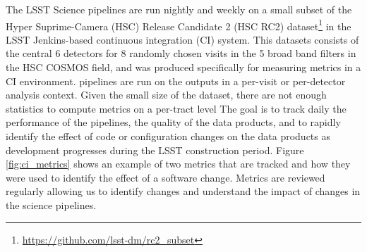 The LSST Science pipelines are run nightly and weekly on a small subset of the Hyper Suprime-Camera (HSC) Release Candidate 2 (HSC RC2) dataset\footnote{\url{https://github.com/lsst-dm/rc2_subset}} in the LSST Jenkins-based continuous integration (CI) system. 
This datasets consists of the central 6 detectors for 8 randomly chosen visits in the 5 broad band filters in the HSC COSMOS field, and was produced specifically for measuring metrics in a CI environment.
\faro pipelines are run on the outputs in a per-visit or per-detector analysis context.
Given the small size of the dataset, there are not enough statistics to compute metrics on a per-tract level 
The goal is to track daily the performance of the pipelines, the quality of the data products, and to rapidly identify the effect of code or configuration changes on the data products as development progresses during the LSST construction period.
Figure \ref{fig:ci_metrics} shows an example of two metrics that are tracked and how they were used to identify the effect of a software change.
Metrics are reviewed regularly allowing us to identify changes and understand the impact of changes in the science pipelines.
